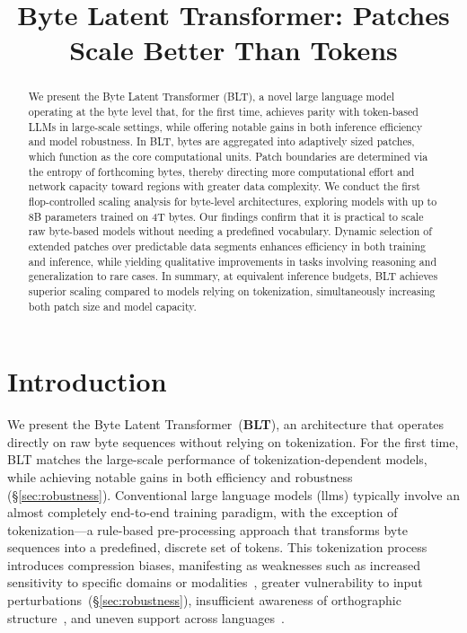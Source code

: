 \title{Byte Latent Transformer: Patches Scale Better Than Tokens}

\begin{abstract}
We present the Byte Latent Transformer ({\textsc BLT}), a novel large language model operating at the byte level that, for the first time, achieves parity with token-based LLMs in large-scale settings, while offering notable gains in both inference efficiency and model robustness. In {\textsc BLT}, bytes are aggregated into adaptively sized patches, which function as the core computational units. Patch boundaries are determined via the entropy of forthcoming bytes, thereby directing more computational effort and network capacity toward regions with greater data complexity. We conduct the first flop-controlled scaling analysis for byte-level architectures, exploring models with up to 8B parameters trained on 4T bytes. Our findings confirm that it is practical to scale raw byte-based models without needing a predefined vocabulary. Dynamic selection of extended patches over predictable data segments enhances efficiency in both training and inference, while yielding qualitative improvements in tasks involving reasoning and generalization to rare cases. In summary, at equivalent inference budgets, {\textsc BLT} achieves superior scaling compared to models relying on tokenization, simultaneously increasing both patch size and model capacity.
\end{abstract}

\section{Introduction}
\label{section:intro}

We present the Byte Latent Transformer~(\textbf{BLT}), an architecture that operates directly on raw byte sequences without relying on tokenization. For the first time, BLT matches the large-scale performance of tokenization-dependent models, while achieving notable gains in both efficiency and robustness (\S\ref{sec:robustness}). Conventional large language models (llms) typically involve an almost completely end-to-end training paradigm, with the exception of tokenization—a rule-based pre-processing approach that transforms byte sequences into a predefined, discrete set of tokens. This tokenization process introduces compression biases, manifesting as weaknesses such as increased sensitivity to specific domains or modalities~\citep{dagangetting}, greater vulnerability to input perturbations~(\S\ref{sec:robustness}), insufficient awareness of orthographic structure~\citep{edman2024cute}, and uneven support across languages~\citep{liang2023xlm,petrov2024language,limisiewicz2024myte}.


